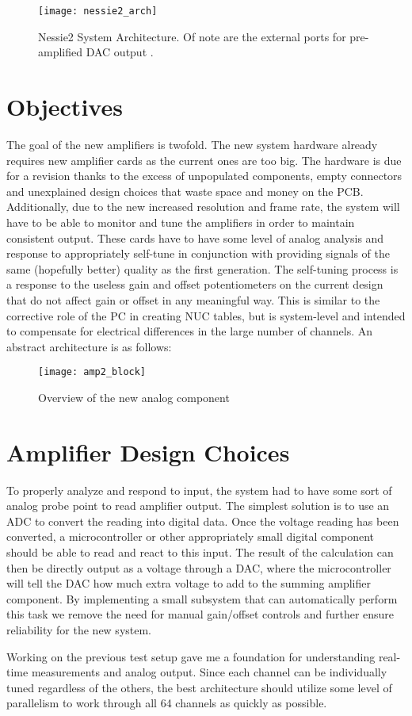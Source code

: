 \begin{figure}[!htb]
	\centering
	\texttt{[image: nessie2\_arch]}
	\caption{Nessie2 System Architecture. Of note are the external ports for pre-amplified DAC output \cite{chris}.}
\end{figure}

\FloatBarrier

\section{Objectives}
The goal of the new amplifiers is twofold. The new system hardware already requires new amplifier cards as the current ones are too big. The hardware is due for a revision thanks to the excess of unpopulated components, empty connectors and unexplained design choices that waste space and money on the PCB. Additionally, due to the new increased resolution and frame rate, the system will have to be able to monitor and tune the amplifiers in order to maintain consistent output. These cards have to have some level of analog analysis and response to appropriately self-tune in conjunction with providing signals of the same (hopefully better) quality as the first generation. The self-tuning process is a response to the useless gain and offset potentiometers on the current design that do not affect gain or offset in any meaningful way. This is similar to the corrective role of the PC in creating NUC tables, but is system-level and intended to compensate for electrical differences in the large number of channels. An abstract architecture is as follows:
\begin{figure}[!htb]
	\centering
	\texttt{[image: amp2\_block]}
	\caption{Overview of the new analog component}
\end{figure}
\section{Amplifier Design Choices}
To properly analyze and respond to input, the system had to have some sort of analog probe point to read amplifier output. The simplest solution is to use an ADC to convert the reading into digital data. Once the voltage reading has been converted, a microcontroller or other appropriately small digital component should be able to read and react to this input. The result of the calculation can then be directly output as a voltage through a DAC, where the microcontroller will tell the DAC how much extra voltage to add to the summing amplifier component. By implementing a small subsystem that can automatically perform this task we remove the need for manual gain/offset controls and further ensure reliability for the new system.\par
Working on the previous test setup gave me a foundation for understanding real-time measurements and analog output. Since each channel can be individually tuned regardless of the others, the best architecture should utilize some level of parallelism to work through all 64 channels as quickly as possible.\par
